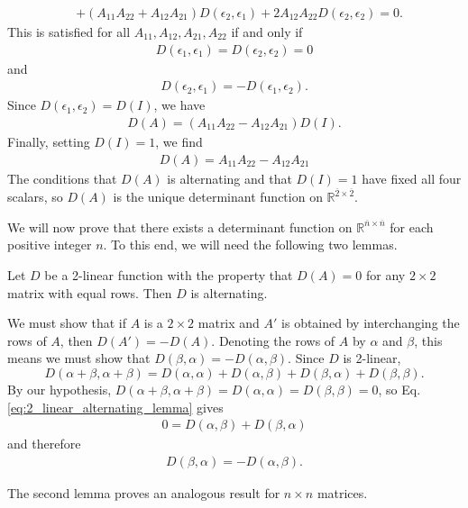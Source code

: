 \documentclass[12pt,letterpaper,reqno]{article}
\numberwithin{equation}{section}
\begin{document}
{\begin{align*}
	&+(A_{11}A_{22}+A_{12}A_{21})D(\epsilon_2,\epsilon_1)+2A_{12}A_{22}D(\epsilon_2,\epsilon_2)=0.
\end{align*}
This is satisfied for all $A_{11}, A_{12}, A_{21}, A_{22}$ if and only if 
\begin{align*}
D(\epsilon_1,\epsilon_1)=D(\epsilon_2,\epsilon_2)=0
\end{align*}
and 
\begin{align*}
	D(\epsilon_2,\epsilon_1)=-D(\epsilon_1,\epsilon_2).
\end{align*}
Since $D(\epsilon_1,\epsilon_2)=D(I)$, we have
\begin{align*}
	D(A)=(A_{11}A_{22}-A_{12}A_{21})D(I).
\end{align*}
Finally, setting $D(I)=1$, we find
\begin{align*}
	D(A)=A_{11}A_{22}-A_{12}A_{21}
\end{align*}
The conditions that $D(A)$ is alternating and that $D(I)=1$ have fixed all four scalars, so $D(A)$ is the unique determinant function on $\mathbb{R}^{\overline{2} \times \overline{2}}$.}

We will now prove that there exists a determinant function on $\mathbb{R}^{\overline{n} \times \overline{n}}$ for each positive integer $n$. To this end, we will need the following two lemmas.

\begin{lem}[$D(A)=0$ implies alternating for $2$-linear functions]
	Let $D$ be a 2-linear function with the property that $D(A)=0$ for any $2 \times 2$ matrix with equal rows. Then $D$ is alternating.
\end{lem}

\begin{pf}
We must show that if $A$ is a $2 \times 2$ matrix and $A'$ is obtained by interchanging the rows of $A$, then $D(A')=-D(A)$. Denoting the rows of $A$ by $\alpha$ and $\beta$, this means we must show that $D(\beta,\alpha)=-D(\alpha,\beta)$. Since $D$ is 2-linear,
\begin{equation}\label{eq:2_linear_alternating_lemma}
	D(\alpha+\beta,\alpha+\beta)=D(\alpha,\alpha)+D(\alpha,\beta)+D(\beta,\alpha)+D(\beta,\beta).
\end{equation}
By our hypothesis, $D(\alpha+\beta,\alpha+\beta)=D(\alpha,\alpha)=D(\beta,\beta)=0$, so Eq. \eqref{eq:2_linear_alternating_lemma} gives
\begin{align*}
	0=D(\alpha,\beta)+D(\beta,\alpha)
\end{align*} 	
and therefore
\begin{align*}
	D(\beta,\alpha)=-D(\alpha,\beta).
\end{align*}
\end{pf}
The second lemma proves an analogous result for $n \times n$ matrices.
\end{document}
